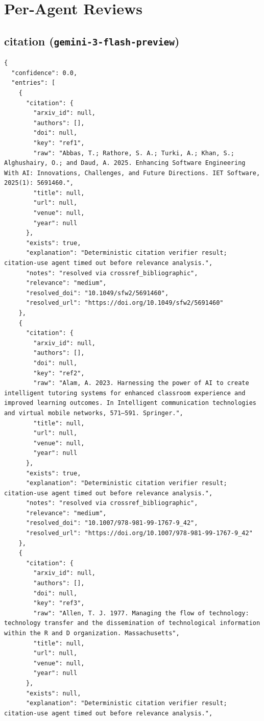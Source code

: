 \documentclass[11pt]{article}
\begin{document}
\section*{Per-Agent Reviews}
\subsection*{citation (\texttt{gemini-3-flash-preview})}
\begin{verbatim}
{
  "confidence": 0.0,
  "entries": [
    {
      "citation": {
        "arxiv_id": null,
        "authors": [],
        "doi": null,
        "key": "ref1",
        "raw": "Abbas, T.; Rathore, S. A.; Turki, A.; Khan, S.; Alghushairy, O.; and Daud, A. 2025. Enhancing Software Engineering With AI: Innovations, Challenges, and Future Directions. IET Software, 2025(1): 5691460.",
        "title": null,
        "url": null,
        "venue": null,
        "year": null
      },
      "exists": true,
      "explanation": "Deterministic citation verifier result; citation-use agent timed out before relevance analysis.",
      "notes": "resolved via crossref_bibliographic",
      "relevance": "medium",
      "resolved_doi": "10.1049/sfw2/5691460",
      "resolved_url": "https://doi.org/10.1049/sfw2/5691460"
    },
    {
      "citation": {
        "arxiv_id": null,
        "authors": [],
        "doi": null,
        "key": "ref2",
        "raw": "Alam, A. 2023. Harnessing the power of AI to create intelligent tutoring systems for enhanced classroom experience and improved learning outcomes. In Intelligent communication technologies and virtual mobile networks, 571–591. Springer.",
        "title": null,
        "url": null,
        "venue": null,
        "year": null
      },
      "exists": true,
      "explanation": "Deterministic citation verifier result; citation-use agent timed out before relevance analysis.",
      "notes": "resolved via crossref_bibliographic",
      "relevance": "medium",
      "resolved_doi": "10.1007/978-981-99-1767-9_42",
      "resolved_url": "https://doi.org/10.1007/978-981-99-1767-9_42"
    },
    {
      "citation": {
        "arxiv_id": null,
        "authors": [],
        "doi": null,
        "key": "ref3",
        "raw": "Allen, T. J. 1977. Managing the flow of technology: technology transfer and the dissemination of technological information within the R and D organization. Massachusetts",
        "title": null,
        "url": null,
        "venue": null,
        "year": null
      },
      "exists": null,
      "explanation": "Deterministic citation verifier result; citation-use agent timed out before relevance analysis.",

\end{verbatim}
\end{document}
